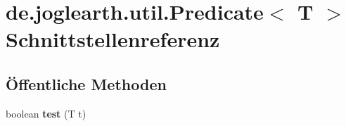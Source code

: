 \section{de.\-joglearth.\-util.\-Predicate$<$ T $>$ Schnittstellenreferenz}
\label{interfacede_1_1joglearth_1_1util_1_1_predicate_3_01_t_01_4}
\subsection*{Öffentliche Methoden}
\begin{DoxyCompactItemize}
\item 
boolean {\bfseries test} (T t)\label{interfacede_1_1joglearth_1_1util_1_1_predicate_3_01_t_01_4_ae9277408b5c3e3bab6ffe9f9c5064858}

\end{DoxyCompactItemize}
